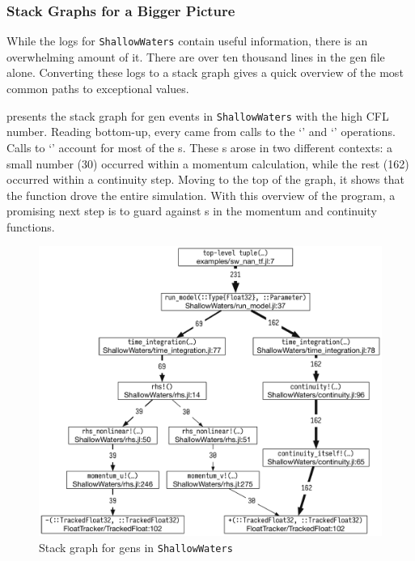 \documentclass{juliacon}
\begin{document}
\subsubsection{Stack Graphs for a Bigger Picture}

While the logs for \texttt{ShallowWaters} contain useful information,
there is an overwhelming amount of it.
There are over ten thousand lines in the gen file alone.
Converting these logs to a stack graph gives a quick overview
of the most common paths to exceptional values.

 presents the stack graph for \NaN{} gen events
in \texttt{ShallowWaters} with the high CFL number.
Reading bottom-up, every \NaN{} came from calls to the `\code{-}' and `\code{+}' operations.
Calls to `\code{+}' account for most of the \NaN{}s.
These \NaN{}s arose in two different contexts: a small number (30)
occurred within a momentum calculation, while the rest (162)
occurred within a continuity step.
Moving to the top of the graph, it shows that the function  drove
the entire simulation.
With this overview of the program, a promising next step is to guard against \NaN{}s
in the momentum and continuity functions.

\begin{figure}[t]
  \centering
  \includegraphics[width=0.96\columnwidth]{fig/sw_nan_cstg_clean.pdf}
  \caption{Stack graph for \NaN{} gens in \texttt{ShallowWaters}}
  \label{fig:sw_nan_cstg}
\end{figure}
\end{document}
